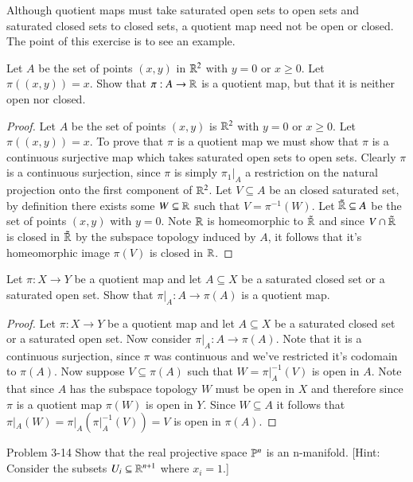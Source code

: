 \documentclass[minion]{homework651}
\begin{document}
\begin{problems}
    \problem
    Although quotient maps must take saturated open sets to open sets
    and saturated closed sets to closed sets, a quotient map need not be open or closed.  The point of this exercise is to see an example.
    
    Let $A$ be the set of points $(x,y)$ in $\mathbb R^2$ with $y=0$ or $x\ge 0$.  Let $\pi((x,y))=x$.
    Show that $\pi:A\rightarrow\mathbb R$ is a quotient map, but that it is neither open nor closed.
    \begin{proof} Let $A$ be the set of points $(x,y)$ is $\mathbb R^2$ with $y=0$ or $x\ge 0$.  Let $\pi((x,y))=x$. To prove that $\pi$ is a 
        quotient map we must show that $\pi$ is a continuous surjective map which takes saturated open sets to open sets.
        Clearly $\pi$ is a continuous surjection, since $\pi$ is simply $\pi_1|_A$ a restriction on the natural projection onto the first component of $\mathbb R^2$. 
        Let $V \subseteq A$ be an closed saturated set, by definition there exists some $W \subseteq \mathbb R$ such that $V = \pi^{-1}(W)$. Let $\tilde{\mathbb R} \subseteq A$
        be the set of points $(x,y)$ with $y=0$. Note $\mathbb R$ is homeomorphic to $\tilde{\mathbb R}$ and since $V \cap \tilde{\mathbb R}$ is closed in $\tilde{\mathbb R}$ by 
        the subspace topology induced by $A$, it follows that it's homeomorphic image $\pi(V)$ is closed in $\mathbb R$. 
    \end{proof}
    
    \problem
    Let $\pi:X\rightarrow Y$ be a quotient map and let $A\subseteq X$
    be a saturated closed set or a saturated open set.  Show that $\pi|_A:A\rightarrow \pi(A)$
    is a quotient map.
    \begin{proof} Let $\pi:X\rightarrow Y$ be a quotient map and let $A\subseteq X$
        be a saturated closed set or a saturated open set. Now consider  $\pi|_A:A\rightarrow \pi(A)$. 
        Note that it is a continuous surjection, since $\pi$ was continuous and we've restricted it's codomain to $\pi(A)$. 
        Now suppose $V \subseteq \pi(A)$ such that $W = \pi|_A^{-1}(V)$ is open in $A$. Note that since $A$ has the subspace topology $W$ must be open 
        in $X$ and therefore since $\pi$ is a quotient map $\pi(W)$ is open in $Y$. Since $W \subseteq A$ it follows that $\pi|_A(W) = \pi|_A(\pi|_A^{-1}(V)) = V$ is open in $\pi(A)$.
    \end{proof}





    
    \problem Problem 3-14 Show that the real projective space $\mathbb P^n$ is an n-manifold. [Hint: Consider the subsets $U_i \subseteq \mathbb R^{n + 1}$ where $x_i = 1$.]
    

\end{problems}
\end{document}
